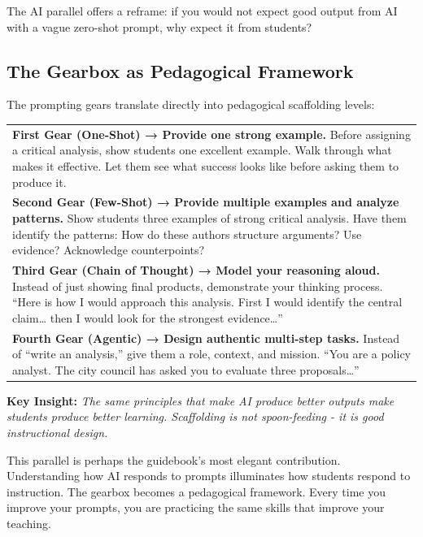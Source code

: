 \documentclass[
  letterpaper,
  DIV=11,
  numbers=noendperiod]{scrreprt}
\newcounter{none} %
\begin{document}
The AI parallel offers a reframe: if you would not expect good output
from AI with a vague zero-shot prompt, why expect it from students?

\subsection{The Gearbox as Pedagogical
Framework}\label{the-gearbox-as-pedagogical-framework}

The prompting gears translate directly into pedagogical scaffolding
levels:

{\def\LTcaptype{none} %
\begin{longtable}[]{@{}
  >{\raggedright\arraybackslash}p{}@{}}
\toprule\noalign{}
\endhead
\bottomrule\noalign{}
\endlastfoot
\textbf{First Gear (One-Shot) → Provide one strong example.} Before
assigning a critical analysis, show students one excellent example. Walk
through what makes it effective. Let them see what success looks like
before asking them to produce it. \\
\textbf{Second Gear (Few-Shot) → Provide multiple examples and analyze
patterns.} Show students three examples of strong critical analysis.
Have them identify the patterns: How do these authors structure
arguments? Use evidence? Acknowledge counterpoints? \\
\textbf{Third Gear (Chain of Thought) → Model your reasoning aloud.}
Instead of just showing final products, demonstrate your thinking
process. ``Here is how I would approach this analysis. First I would
identify the central claim\ldots{} then I would look for the strongest
evidence\ldots{}'' \\
\textbf{Fourth Gear (Agentic) → Design authentic multi-step tasks.}
Instead of ``write an analysis,'' give them a role, context, and
mission. ``You are a policy analyst. The city council has asked you to
evaluate three proposals\ldots{}'' \\
\end{longtable}
}

\textbf{Key Insight:} \emph{The same principles that make AI produce
better outputs make students produce better learning. Scaffolding is not
spoon-feeding - it is good instructional design.}

This parallel is perhaps the guidebook's most elegant contribution.
Understanding how AI responds to prompts illuminates how students
respond to instruction. The gearbox becomes a pedagogical framework.
Every time you improve your prompts, you are practicing the same skills
that improve your teaching.
\end{document}
